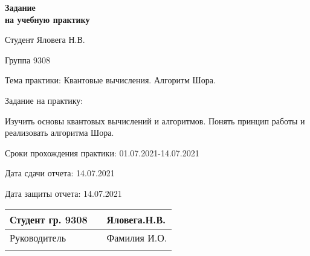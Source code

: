 \clearpage

\begin{center}
\textbf{Задание \\ на учебную практику}
 
\end{center}
\begin{flushleft}
Студент Яловега Н.В.

Группа 9308

Тема практики: Квантовые вычисления. Алгоритм Шора.

\vspace{10mm}

Задание на практику:

Изучить основы квантовых вычислений и алгоритмов. Понять принцип работы и реализовать алгоритма Шора.

\vspace{80mm} %

Сроки прохождения практики: 01.07.2021-14.07.2021

Дата сдачи отчета: 14.07.2021

Дата защиты отчета: 14.07.2021

\end{flushleft}

\begin{center}
	\def\arraystretch{1.5}
	\begin{tabularx}{\textwidth}{ >{\hsize=7cm}X >{\hsize=4cm}X  >{\centering\arraybackslash}X }
		Студент гр. 9308 & & Яловега.Н.В. \\ \cline{2-2}
		Руководитель & & Фамилия И.О. \\ \cline{2-2}
	\end{tabularx}
	\def\arraystretch{1}
\end{center}

\newpage
